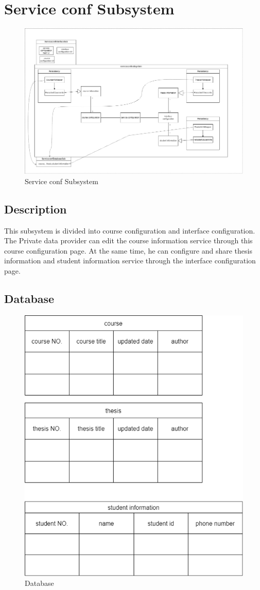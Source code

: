 \section{Service conf Subsystem}

\begin{figure}[H]
    \centering
    \includegraphics[width=0.75\linewidth]{picture/3-2/3-2-1.png}
    \caption{Service conf Subsystem}
    \label{fig:enter-label}
\end{figure}

\subsection{Description}

This subsystem is divided into course configuration and interface configuration. The Private data provider can edit the course information service through this course configuration page. At the same time, he can configure and share thesis information and student information service through the interface configuration page.

\subsection{Database}
\begin{figure}[H]
    \centering
    \includegraphics[width=0.75\linewidth]{picture/3-2/3-2-2.png}
    \caption{Database}
    \label{fig:enter-label}
\end{figure}

